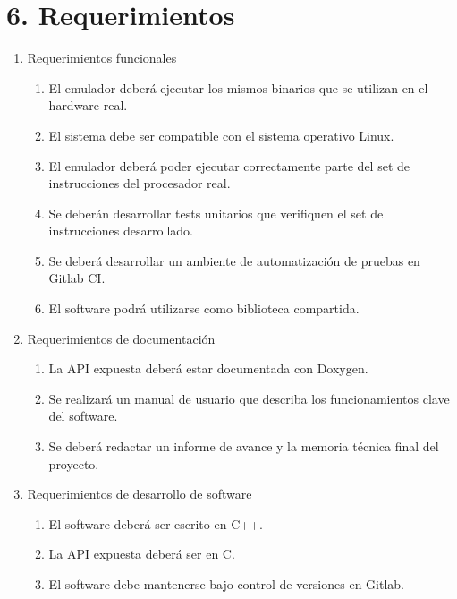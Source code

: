 \section{6. Requerimientos}
\label{sec:6-requerimientos}

\begin{enumerate}
\item Requerimientos funcionales
  \begin{enumerate}
  \item El emulador deberá ejecutar los mismos binarios que se utilizan en el hardware real.
  \item El sistema debe ser compatible con el sistema operativo Linux.
  \item El emulador deberá poder ejecutar correctamente parte del set de instrucciones del procesador real.
  \item Se deberán desarrollar tests unitarios que verifiquen el set de instrucciones desarrollado.
  \item Se deberá desarrollar un ambiente de automatización de pruebas en Gitlab CI.
  \item El software podrá utilizarse como biblioteca compartida.
  \end{enumerate}

\item Requerimientos de documentación
  \begin{enumerate}
  \item La API expuesta deberá estar documentada con Doxygen.
  \item Se realizará un manual de usuario que describa los funcionamientos clave del software.
  \item Se deberá redactar un informe de avance y la memoria técnica final del proyecto.
  \end{enumerate}

\item Requerimientos de desarrollo de software
  \begin{enumerate}
  \item El software deberá ser escrito en C++.
  \item La API expuesta deberá ser en C.
  \item El software debe mantenerse bajo control de versiones en Gitlab.
  \end{enumerate}
\end{enumerate}


